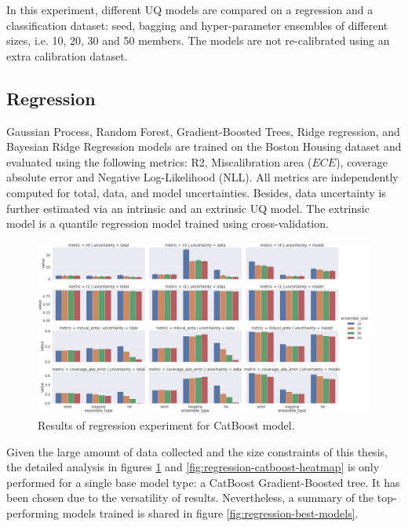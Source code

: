 In this experiment, different UQ models are compared on a regression and a classification dataset: seed, bagging and hyper-parameter ensembles of different sizes, i.e. 10, 20, 30 and 50 members. The models are not re-calibrated using an extra calibration dataset. 



\subsection{Regression}

Gaussian Process, Random Forest, Gradient-Boosted Trees, Ridge regression, and Bayesian Ridge Regression models are trained on the Boston Housing dataset and evaluated using the following metrics: R2, Miscalibration area ($ECE$), coverage absolute error and Negative Log-Likelihood (NLL). All metrics are independently computed for total, data, and model uncertainties. Besides, data uncertainty is further estimated via an intrinsic and an extrinsic UQ model. The extrinsic model is a quantile regression model trained using cross-validation. %

\begin{figure}[!ht]
    \centering
    \includegraphics[width=\linewidth]{figures/eval/uqlearn/regression-results.png}
    \caption{Results of regression experiment for CatBoost model.}
    \label{fig:regression-catboost-results}
\end{figure}
Given the large amount of data collected and the size constraints of this thesis, the detailed analysis in figures \ref{fig:regression-catboost-results} and \ref{fig:regression-catboost-heatmap} is only performed for a single base model type: a CatBoost Gradient-Boosted tree. It has been chosen due to the versatility of results. Nevertheless, a summary of the top-performing models trained is shared in figure \ref{fig:regression-best-models}. 

